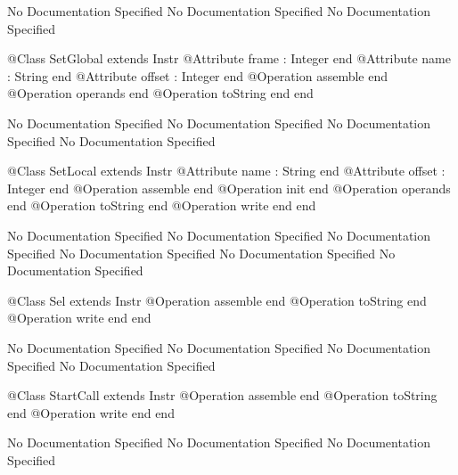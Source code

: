 No Documentation Specified
No Documentation Specified
No Documentation Specified
\begin{Interface}
@Class SetGlobal extends Instr
  @Attribute frame : Integer end
  @Attribute name : String end
  @Attribute offset : Integer end
  @Operation assemble end
  @Operation operands end
  @Operation toString end
end
\end{Interface}
No Documentation Specified
No Documentation Specified
No Documentation Specified
No Documentation Specified
\begin{Interface}
@Class SetLocal extends Instr
  @Attribute name : String end
  @Attribute offset : Integer end
  @Operation assemble end
  @Operation init end
  @Operation operands end
  @Operation toString end
  @Operation write end
end
\end{Interface}
No Documentation Specified
No Documentation Specified
No Documentation Specified
No Documentation Specified
No Documentation Specified
No Documentation Specified
\begin{Interface}
@Class Sel extends Instr
  @Operation assemble end
  @Operation toString end
  @Operation write end
end
\end{Interface}
No Documentation Specified
No Documentation Specified
No Documentation Specified
No Documentation Specified
\begin{Interface}
@Class StartCall extends Instr
  @Operation assemble end
  @Operation toString end
  @Operation write end
end
\end{Interface}
No Documentation Specified
No Documentation Specified
No Documentation Specified

